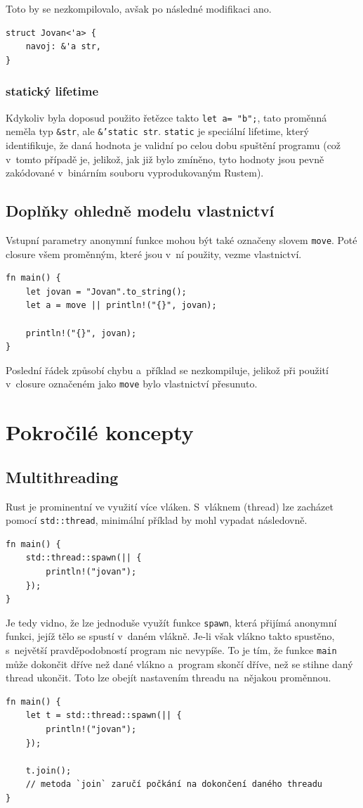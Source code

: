 \documentclass[a4paper, 12pt]{article} %
\newcommand{\rust}[1]{\texttt{#1}}
\begin{document}
			Toto by se nezkompilovalo, avšak po následné modifikaci ano.
			\begin{verbatim}
struct Jovan<'a> {
	navoj: &'a str,
}
			\end{verbatim}
			
			\subsubsection*{statický lifetime}
				Kdykoliv byla doposud použito řetězce takto \rust{let a= "b";}, tato proměnná neměla typ \rust{&str}, ale \rust{&'static str}. \rust{static} je speciální lifetime, který identifikuje, že daná hodnota je validní po celou dobu spuštění programu (což v~tomto případě je, jelikož, jak již bylo zmíněno, tyto hodnoty jsou pevně zakódované v~binárním souboru vyprodukovaným Rustem).


			\subsection{Doplňky ohledně modelu vlastnictví}
				Vstupní parametry anonymní funkce mohou být také označeny slovem \rust{move}. Poté closure všem proměnným, které jsou v~ní použity, vezme vlastnictví. 
				\begin{verbatim}
fn main() {
	let jovan = "Jovan".to_string();
	let a = move || println!("{}", jovan);

	println!("{}", jovan);
}
				\end{verbatim}

				Poslední řádek způsobí chybu a~příklad se nezkompiluje, jelikož při použití v~closure označeném jako \rust{move} bylo vlastnictví přesunuto.

\section{Pokročilé koncepty}
	\subsection{Multithreading}
		Rust je prominentní ve využití více vláken. S~vláknem (thread) lze zacházet pomocí \rust{std::thread}, minimální příklad by mohl vypadat následovně.
		\begin{verbatim}
fn main() {
	std::thread::spawn(|| {
		println!("jovan");
	});
}
		\end{verbatim}
		
		Je tedy vidno, že lze jednoduše využít funkce \rust{spawn}, která přijímá anonymní funkci, jejíž tělo se spustí v~daném vlákně. Je-li však vlákno takto spustěno, s~největší pravděpodobností program nic nevypíše. To je tím, že funkce \rust{main} může dokončit dříve než dané vlákno a~program skončí dříve, než se stihne daný thread ukončit. Toto lze obejít nastavením threadu na~nějakou proměnnou.
		\begin{verbatim}
fn main() {
	let t = std::thread::spawn(|| {
		println!("jovan");
	});
	
	t.join();
	// metoda `join` zaručí počkání na dokončení daného threadu
}
		\end{verbatim}
		
\end{document}

